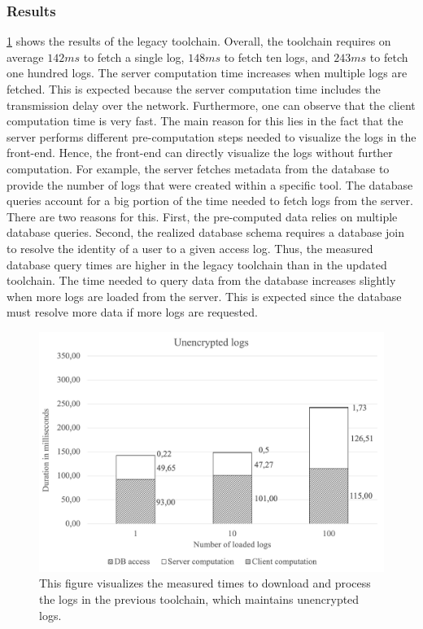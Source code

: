 \documentclass[../main.tex]{subfiles}
\begin{document}
\subsubsection{Results}
\cref{fig:perf-unencrypted} shows the results of the legacy toolchain.
Overall, the toolchain requires on average $142ms$ to fetch a single log, $148ms$ to fetch ten logs, and $243ms$ to fetch one hundred logs.
The server computation time increases when multiple logs are fetched.
This is expected because the server computation time includes the transmission delay over the network.
Furthermore, one can observe that the client computation time is very fast.
The main reason for this lies in the fact that the server performs different pre-computation steps needed to visualize the logs in the front-end.
Hence, the front-end can directly visualize the logs without further computation.
For example, the server fetches metadata from the database to provide the number of logs that were created within a specific tool.
The database queries account for a big portion of the time needed to fetch logs from the server.
There are two reasons for this.
First, the pre-computed data relies on multiple database queries.
Second, the realized database schema requires a database join to resolve the identity of a user to a given access log.
Thus, the measured database query times are higher in the legacy toolchain than in the updated toolchain.
The time needed to query data from the database increases slightly when more logs are loaded from the server.
This is expected since the database must resolve more data if more logs are requested.

\begin{figure}[ht]
    \includegraphics[scale=0.62]{../img/07/unencrypted.png}
    \centering
    \caption[Measurements legacy toolchain]{This figure visualizes the measured times to download and process the logs in the previous toolchain, which maintains unencrypted logs.}
    \label{fig:perf-unencrypted}
\end{figure}
\end{document}
